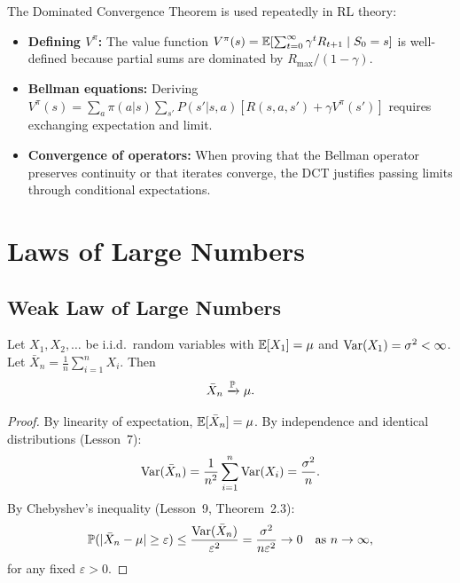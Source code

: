 \documentclass[11pt,a4paper]{article}
\begin{document}
\begin{rlconnection}[title={DCT in Value Function Theory}]
The Dominated Convergence Theorem is used repeatedly in RL theory:
\begin{itemize}[nosep]
  \item \textbf{Defining $V^\pi$:} The value function
    $V^\pi(s) = \mathbb{E}[\sum_{t=0}^\infty \gamma^t R_{t+1} \mid S_0=s]$
    is well-defined because partial sums are dominated by
    $R_{\max}/(1-\gamma)$.
  \item \textbf{Bellman equations:} Deriving
    $V^\pi(s) = \sum_a \pi(a|s) \sum_{s'} P(s'|s,a)[R(s,a,s')
    + \gamma V^\pi(s')]$ requires exchanging expectation and limit.
  \item \textbf{Convergence of operators:} When proving that the
    Bellman operator preserves continuity or that iterates converge,
    the DCT justifies passing limits through conditional
    expectations.
\end{itemize}
\end{rlconnection}


\section{Laws of Large Numbers}
\label{sec:lln}

\subsection{Weak Law of Large Numbers}
\label{subsec:wlln}

\begin{keyresult}[title={Weak Law of Large Numbers}]
\begin{theorem}
\label{thm:wlln}
Let $X_1, X_2, \ldots$ be i.i.d.\ random variables with
$\mathbb{E}[X_1] = \mu$ and $\operatorname{Var}(X_1) = \sigma^2 < \infty$.  Let
$\bar{X}_n = \frac{1}{n}\sum_{i=1}^n X_i$.  Then
\begin{equation}
  \bar{X}_n \xrightarrow{\mathbb{P}} \mu.
  \label{eq:wlln}
\end{equation}
\end{theorem}
\end{keyresult}

\begin{proof}
By linearity of expectation, $\mathbb{E}[\bar{X}_n] = \mu$.  By
independence and identical distributions (Lesson~7):
\begin{equation}
  \operatorname{Var}(\bar{X}_n)
  = \frac{1}{n^2} \sum_{i=1}^n \operatorname{Var}(X_i)
  = \frac{\sigma^2}{n}.
\end{equation}
By Chebyshev's inequality (Lesson~9, Theorem~2.3):
\begin{equation}
  \mathbb{P}(|\bar{X}_n - \mu| \geq \varepsilon)
  \leq \frac{\operatorname{Var}(\bar{X}_n)}{\varepsilon^2}
  = \frac{\sigma^2}{n\varepsilon^2} \to 0
  \quad \text{as } n \to \infty,
\end{equation}
for any fixed $\varepsilon > 0$.
\end{proof}
\end{document}

